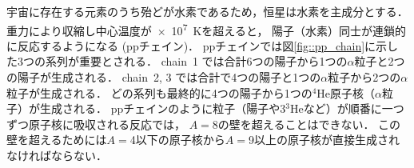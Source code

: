 \documentclass[../master]{subfiles}
\begin{document}
宇宙に存在する元素のうち殆どが水素であるため，恒星は水素を主成分とする．
重力により収縮し中心温度が\SI{e7}{\kelvin}を超えると，
陽子（水素）同士が連鎖的に反応するようになる (ppチェイン)．
ppチェインでは図\ref{fig::pp_chain}に示した3つの系列が重要とされる．
chain~1 では合計6つの陽子から1つの$\alpha$粒子と2つの陽子が生成される．
chain~2, 3 では合計で4つの陽子と1つの$\alpha$粒子から2つの$\alpha$粒子が生成される．
どの系列も最終的に4つの陽子から1つの${}^{4}\mathrm{He}$原子核（$\alpha$粒子）が生成される．
ppチェインのように粒子（陽子や$3{}^{3}\mathrm{He}$など）が順番に一つずつ原子核に吸収される反応では，
$A = $8の壁を超えることはできない．
この壁を超えるためには$A = $4以下の原子核から$A = $9以上の原子核が直接生成されなければならない．
\end{document}
